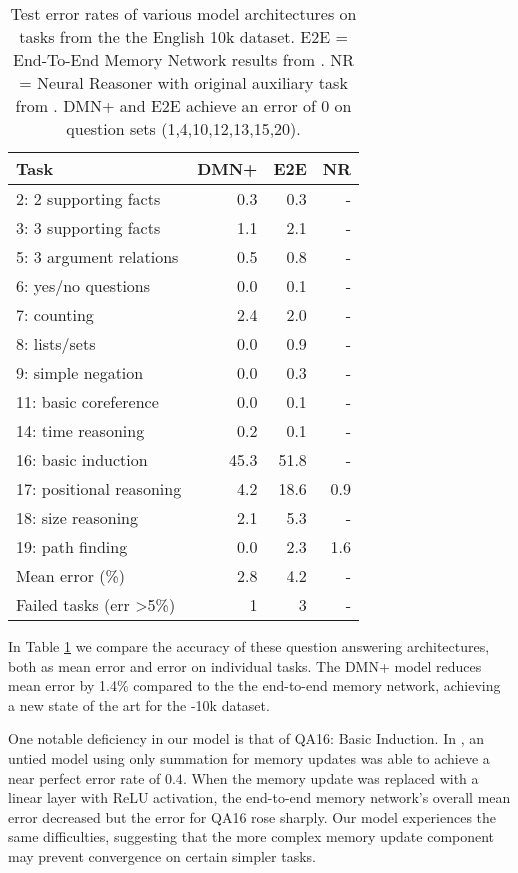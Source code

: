 \documentclass{article}
\begin{document}
\begin{table}
\centering
\begin{tabular}{lrrr}
Task & DMN+ & E2E & NR \\
\hline
2: 2 supporting facts & 0.3 & 0.3& -\\
3: 3 supporting facts & 1.1 & 2.1& -\\
5: 3 argument relations & 0.5 & 0.8& -\\
6: yes/no questions & 0.0 & 0.1& -\\
7: counting & 2.4 & 2.0& -\\
8: lists/sets & 0.0 & 0.9& -\\
9: simple negation & 0.0 & 0.3& -\\
11: basic coreference & 0.0 & 0.1& -\\
14: time reasoning & 0.2 & 0.1& -\\
16: basic induction & 45.3 & 51.8& -\\
17: positional reasoning & 4.2 & 18.6 & 0.9\\
18: size reasoning & 2.1 & 5.3 & -\\
19: path finding & 0.0 & 2.3 & 1.6\\
\hline
Mean error (\%) & 2.8 & 4.2 & - \\
Failed tasks (err \textgreater 5\%) & 1 & 3 & - \\
\end{tabular}
\caption{
Test error rates of various model architectures on tasks from the the \babi English 10k dataset.
E2E = End-To-End Memory Network results from \citet{Sukhbaatar2015}.
NR = Neural Reasoner with original auxiliary task from \citet{Peng2015}.
DMN+ and E2E achieve an error of 0 on \babi question sets (1,4,10,12,13,15,20).
}
\label{table:babi-sota}
\end{table}

In Table \ref{table:babi-sota} we compare the accuracy of these question answering architectures, both as mean error and error on individual tasks.
The DMN+ model reduces mean error by 1.4\% compared to the the end-to-end memory network, achieving a new state of the art for the \babi-10k dataset.

One notable deficiency in our model is that of QA16: Basic Induction.
In \citet{Sukhbaatar2015}, an untied model using only summation for memory updates was able to achieve a near perfect error rate of $0.4$.
When the memory update was replaced with a linear layer with ReLU activation, the end-to-end memory network's overall mean error decreased but the error for QA16 rose sharply.
Our model experiences the same difficulties, suggesting that the more complex memory update component may prevent convergence on certain simpler tasks.
\end{document}
